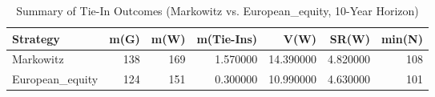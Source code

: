 \begin{table}
\caption{Summary of Tie-In Outcomes (Markowitz vs. European_equity, 10-Year Horizon)}
\label{tab:tie_in_summary}
\begin{tabular}{lrrrrrr}
\toprule
Strategy & m(G) & m(W) & m(Tie-Ins) & V(W) & SR(W) & min(N) \\
\midrule
Markowitz & 138 & 169 & 1.570000 & 14.390000 & 4.820000 & 108 \\
European_equity & 124 & 151 & 0.300000 & 10.990000 & 4.630000 & 101 \\
\bottomrule
\end{tabular}
\end{table}
